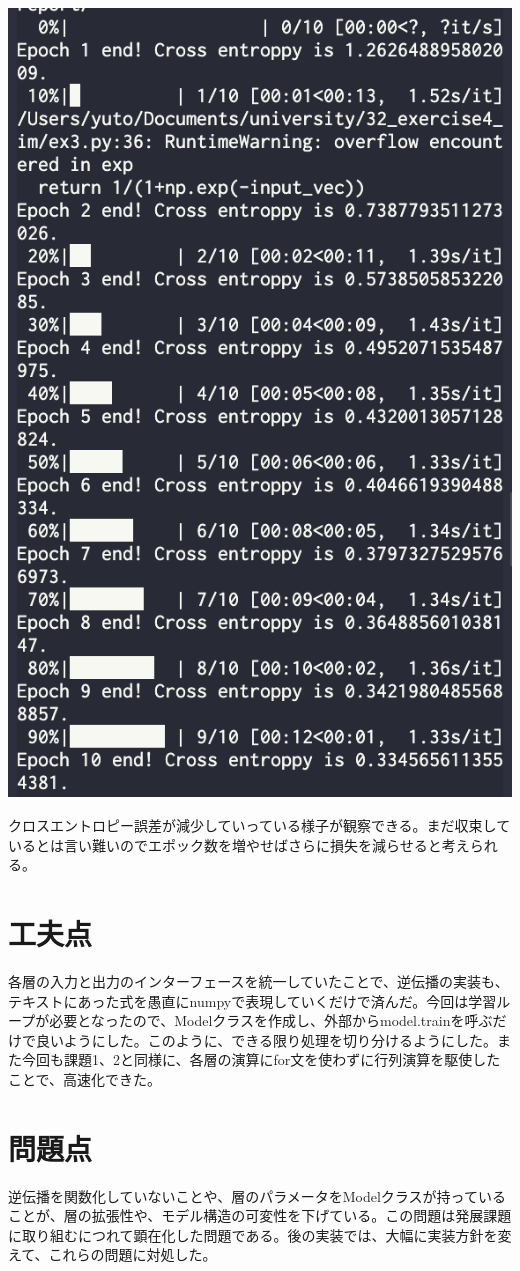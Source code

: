 \documentclass[platex,dvipdfmx]{jsarticle}
\begin{document}
  \includegraphics[]{ex3_output.png}

  クロスエントロピー誤差が減少していっている様子が観察できる。まだ収束しているとは言い難いのでエポック数を増やせばさらに損失を減らせると考えられる。

  \section{工夫点}

  各層の入力と出力のインターフェースを統一していたことで、逆伝播の実装も、テキストにあった式を愚直にnumpyで表現していくだけで済んだ。今回は学習ループが必要となったので、Modelクラスを作成し、外部からmodel.trainを呼ぶだけで良いようにした。このように、できる限り処理を切り分けるようにした。また今回も課題1、2と同様に、各層の演算にfor文を使わずに行列演算を駆使したことで、高速化できた。
  
  \section{問題点}

  逆伝播を関数化していないことや、層のパラメータをModelクラスが持っていることが、層の拡張性や、モデル構造の可変性を下げている。この問題は発展課題に取り組むにつれて顕在化した問題である。後の実装では、大幅に実装方針を変えて、これらの問題に対処した。
  
\end{document}
